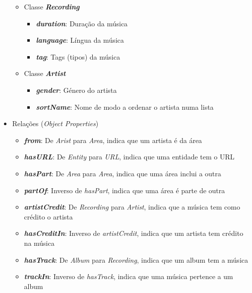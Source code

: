 \documentclass{article}
\begin{document}
\begin{itemize}
\begin{itemize}
\begin{itemize}
        \end{itemize}
        \item Classe \textbf{\textit{Recording}}
        \begin{itemize}
            \item \textbf{\textit{duration}}: Duração da música
            \item \textbf{\textit{language}}: Língua da música
            \item \textbf{\textit{tag}}: Tags (tipos) da música
        \end{itemize}
        \item Classe \textbf{\textit{Artist}}
        \begin{itemize}
            \item \textbf{\textit{gender}}: Género do artista
            \item \textbf{\textit{sortName}}: Nome de modo a ordenar o artista numa lista
        \end{itemize}
    \end{itemize}
    \item Relações (\textit{Object Properties})
    \begin{itemize}
        \item \textbf{\textit{from}}: De \textit{Arist} para \textit{Area}, indica que um artista é da área
        \item \textbf{\textit{hasURL}}: De \textit{Entity} para \textit{URL}, indica que uma entidade tem o URL
        \item \textbf{\textit{hasPart}}: De \textit{Area} para \textit{Area}, indica que uma área inclui a outra
        \item \textbf{\textit{partOf}}: Inverso de \textit{hasPart}, indica que uma área é parte de outra
        \item \textbf{\textit{artistCredit}}: De \textit{Recording} para \textit{Artist}, indica que a música tem como crédito o artista
        \item \textbf{\textit{hasCreditIn}}: Inverso de \textit{artistCredit}, indica que um artista tem crédito na música
        \item \textbf{\textit{hasTrack}}: De \textit{Album} para \textit{Recording}, indica que um album tem a música
        \item \textbf{\textit{trackIn}}: Inverso de \textit{hasTrack}, indica que uma música pertence a um album
    \end{itemize}
\end{itemize}
\end{document}
